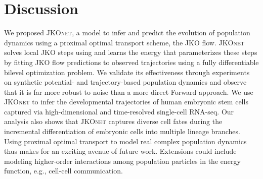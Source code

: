 \section{Discussion}
We proposed \textsc{JKOnet}, a model to infer and predict the evolution of population dynamics using a proximal optimal transport scheme, the \acrshort{JKO} flow.
\textsc{JKOnet} solves local \acrshort{JKO} steps using  and learns the energy that parameterizes these steps by fitting \acrshort{JKO} flow predictions to observed trajectories using a fully differentiable bilevel optimization problem.
We validate its effectiveness through experiments on synthetic potential- and trajectory-based population dynamics and observe that it is far more robust to noise than a more direct Forward approach. We use \textsc{JKOnet} to infer the developmental trajectories of human embryonic stem cells captured via high-dimensional and time-resolved single-cell RNA-seq. 
Our analysis also shows that \textsc{JKOnet} captures diverse cell fates during the incremental differentiation of embryonic cells into multiple lineage branches.
Using proximal optimal transport to model real complex population dynamics thus makes for an exciting avenue of future work. Extensions could include modeling higher-order interactions among population particles in the energy function, e.g., cell-cell communication.
